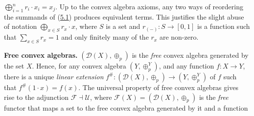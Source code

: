 \hypertarget{html:S5.SS0.SSS0.P0.SPx1.p2.m7}{}\({\bigoplus_{i=1}^{n}r_{i}\cdot x_{i}=x_{j}}\). Up to the convex algebra axioms, any two ways of reordering the summands of (\hyperlink{html:S5.E1}{5.1}) produces equivalent terms. This justifies the slight abuse of notation %
\hypertarget{html:S5.SS0.SSS0.P0.SPx1.p2.m8}{}\({\bigoplus_{x\in S}r_{x}\cdot x}\), where %
\hypertarget{html:S5.SS0.SSS0.P0.SPx1.p2.m9}{}\({S}\) is a set and %
\hypertarget{html:S5.SS0.SSS0.P0.SPx1.p2.m10}{}\({r_{(-)}\colon S\to[0,1]}\) is a function such that %
\hypertarget{html:S5.SS0.SSS0.P0.SPx1.p2.m11}{}\({\sum_{x\in S}r_{x}=1}\) and only finitely many of the %
\hypertarget{html:S5.SS0.SSS0.P0.SPx1.p2.m12}{}\({r_{x}}\) are non-zero.
\par\medskip
\hypertarget{html:S5.SS0.SSS0.P0.SPx2}{} \par\noindent\textbf{Free convex algebras.}\quad  %
\hypertarget{html:S5.SS0.SSS0.P0.SPx2.p1}{} %
\hypertarget{html:S5.SS0.SSS0.P0.SPx2.p1.m1}{}\({({\mathcal{D}}(X),\oplus_{p})}\) is the \emph{free} convex algebra generated by the set %
\hypertarget{html:S5.SS0.SSS0.P0.SPx2.p1.m2}{}\({X}\). Hence, for any convex algebra %
\hypertarget{html:S5.SS0.SSS0.P0.SPx2.p1.m3}{}\({(Y,\oplus^{Y}_{p})}\), and any function %
\hypertarget{html:S5.SS0.SSS0.P0.SPx2.p1.m4}{}\({f\colon X\to Y}\), there is a unique \emph{linear extension} %
\hypertarget{html:S5.SS0.SSS0.P0.SPx2.p1.m5}{}\({f^{\#}\colon({\mathcal{D}}(X),\oplus_{p})\to(Y,\oplus^{Y}_{p})}\) of %
\hypertarget{html:S5.SS0.SSS0.P0.SPx2.p1.m6}{}\({f}\) such that %
\hypertarget{html:S5.SS0.SSS0.P0.SPx2.p1.m7}{}\({f^{\#}(1\cdot x)=f(x)}\). The universal property of free convex algebras gives rise to the adjunction %
\hypertarget{html:S5.SS0.SSS0.P0.SPx2.p1.m8}{}\({\mathcal{F}\dashv\mathcal{U}}\), where %
\hypertarget{html:S5.SS0.SSS0.P0.SPx2.p1.m9}{}\({{\mathcal{F}}(X)=({\mathcal{D}}(X),\oplus_{p})}\) is the \emph{free} functor that maps a set to the free convex algebra generated by it and a function %
